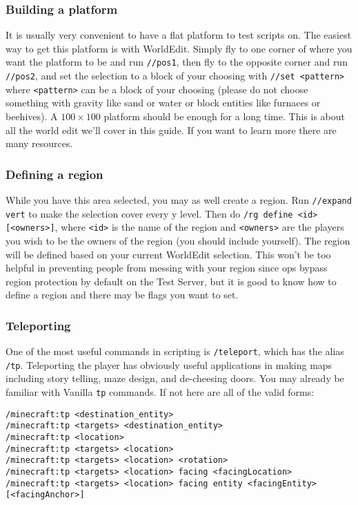 \documentclass[oneside]{book}
\begin{document}
\subsubsection*{Building a platform}

It is usually very convenient to have a flat platform to test scripts on. The easiest way to get this platform is with WorldEdit. Simply fly to one corner of where you want the platform to be and run \texttt{//pos1}, then fly to the opposite corner and run \texttt{//pos2}, and set the selection to a block of your choosing with \texttt{//set <pattern>} where \texttt{<pattern>} can be a block of your choosing (please do not choose something with gravity like sand or water or block entities like furnaces or beehives). A $100 \times 100$ platform should be enough for a long time. This is about all the world edit we'll cover in this guide. If you want to learn more there are many resources. %

\subsubsection*{Defining a region}

While you have this area selected, you may as well create a region. Run \texttt{//expand vert} to make the selection cover every y level. Then do \texttt{/rg define <id> [<owners>]}, where \texttt{<id>} is the name of the region and \texttt{<owners>} are the players you wish to be the owners of the region (you should include yourself). The region will be defined based on your current WorldEdit selection. This won't be too helpful in preventing people from messing with your region since ops bypass region protection by default on the Test Server, but it is good to know how to define a region and there may be flags you want to set.

\subsubsection*{Teleporting}

One of the most useful commands in scripting is \texttt{/teleport}, which has the alias \texttt{/tp}. Teleporting the player has obviously useful applications in making maps including story telling, maze design, and de-cheesing doors. You may already be familiar with Vanilla \texttt{tp} commands. If not here are all of the valid forms:

\begin{verbatim}
/minecraft:tp <destination_entity>
/minecraft:tp <targets> <destination_entity>
/minecraft:tp <location>
/minecraft:tp <targets> <location>
/minecraft:tp <targets> <location> <rotation>
/minecraft:tp <targets> <location> facing <facingLocation>
/minecraft:tp <targets> <location> facing entity <facingEntity> [<facingAnchor>]
\end{verbatim}
\end{document}
